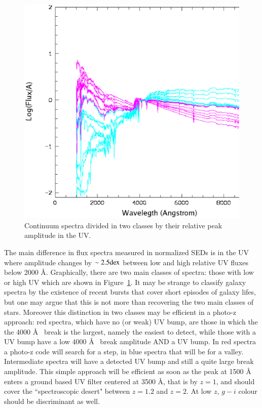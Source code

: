 \documentclass[referee]{aa}
\begin{document}
\begin{figure}
  \centering
  \vspace{0.0cm}
  \includegraphics[width=14cm]{figures/UVspectra.eps}
 \vspace{0.0cm}
    \caption{Continuum spectra divided in two classes by their relative peak amplitude in the UV.}
     \label{2classes}
\end{figure}


The main difference in flux spectra measured in normalized SEDs is in the UV where amplitude changes by
$\rm \sim 2.5dex$ between low and high relative UV fluxes below 2000 \AA. Graphically, 
there are two main classes of spectra: those with low or high UV which are shown in Figure~\ref{2classes}.
It may be strange to classify galaxy spectra by the existence of recent bursts that cover short episodes of galaxy
lifes, but one may argue that this is not more than recovering the two main classes of stars. Moreover this
distinction in two classes may be efficient in a photo-z approach: red spectra, which have no (or weak) UV bump,
are those in which the the 4000 \AA~ break is the largest, namely the easiest to detect, while those with a UV bump have
a low 4000 \AA~ break amplitude AND a UV bump. In red spectra a photo-z code will search for a step,
in blue spectra that will be for a valley. Intermediate spectra will have a detected UV bump and still a quite large break
amplitude. This simple approach will be efficient as soon as the peak at 1500 \AA~ enters a ground based UV filter 
centered at 3500 \AA, that is by $z = 1$, and should cover the ``spectroscopic desert" between $z = 1.2$ and $z = 2$.
At low $z$,  $g - i$ colour should be discriminant as well.
\end{document}
